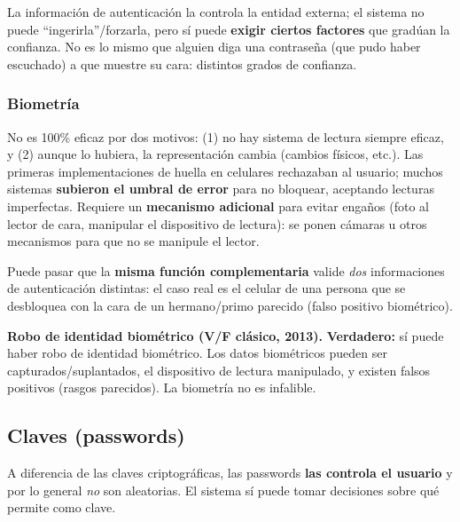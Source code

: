 \documentclass[../main.tex]{subfiles}
\begin{document}
\begin{destacado}
La información de autenticación la controla la entidad externa; el sistema no puede ``ingerirla''/forzarla, pero sí puede \textbf{exigir ciertos factores} que gradúan la confianza. No es lo mismo que alguien diga una contraseña (que pudo haber escuchado) a que muestre su cara: distintos grados de confianza.
\end{destacado}

\subsubsection{Biometría}

No es 100\% eficaz por dos motivos: (1) no hay sistema de lectura siempre eficaz, y (2) aunque lo hubiera, la representación cambia (cambios físicos, etc.). Las primeras implementaciones de huella en celulares rechazaban al usuario; muchos sistemas \textbf{subieron el umbral de error} para no bloquear, aceptando lecturas imperfectas. Requiere un \textbf{mecanismo adicional} para evitar engaños (foto al lector de cara, manipular el dispositivo de lectura): se ponen cámaras u otros mecanismos para que no se manipule el lector.

\begin{destacado}
Puede pasar que la \textbf{misma función complementaria} valide \emph{dos} informaciones de autenticación distintas: el caso real es el celular de una persona que se desbloquea con la cara de un hermano/primo parecido (falso positivo biométrico).
\end{destacado}

\begin{examen}
\textbf{Robo de identidad biométrico (V/F clásico, 2013).} \textbf{Verdadero:} sí puede haber robo de identidad biométrico. Los datos biométricos pueden ser capturados/suplantados, el dispositivo de lectura manipulado, y existen falsos positivos (rasgos parecidos). La biometría no es infalible.
\end{examen}

\subsection{Claves (passwords)}

A diferencia de las claves criptográficas, las passwords \textbf{las controla el usuario} y por lo general \emph{no} son aleatorias. El sistema sí puede tomar decisiones sobre qué permite como clave.
\end{document}
